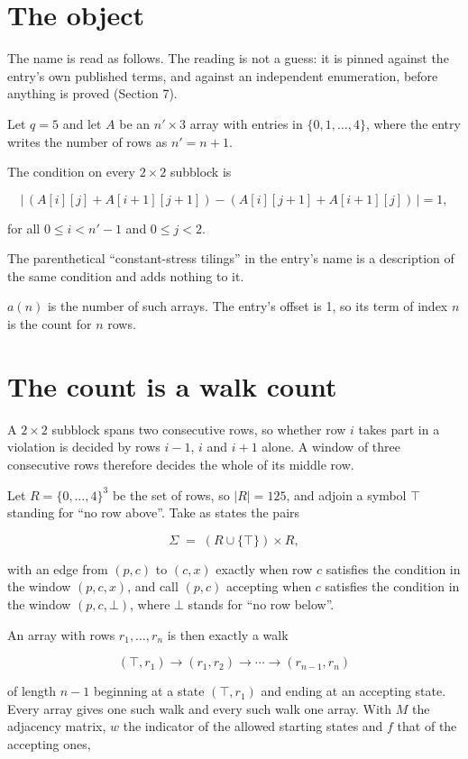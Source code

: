 \documentclass[11pt]{article}
\theoremstyle{definition}
\begin{document}
\section{The object}

The name is read as follows. The reading is not a guess: it is pinned against the entry's own published terms, and against an independent enumeration, before anything is proved (Section 7).

Let $q = 5$ and let $A$ be an $n' \times 3$ array with entries in $\{0,1,\dots,4\}$, where the entry writes the number of rows as $n' = n + 1$.

The condition on every $2 \times 2$ subblock is

\[\bigl|\,(A[i][j] + A[i{+}1][j{+}1]) - (A[i][j{+}1] + A[i{+}1][j])\,\bigr| = 1,\]

for all $0 \le i < n'-1$ and $0 \le j < 2$.

The parenthetical ``constant-stress tilings'' in the entry's name is a description of the same condition and adds nothing to it.

$a(n)$ is the number of such arrays. The entry's offset is 1, so its term of index $n$ is the count for $n$ rows.

\section{The count is a walk count}

A $2 \times 2$ subblock spans two consecutive rows, so whether row $i$ takes part in a violation is decided by rows $i-1$, $i$ and $i+1$ alone. A window of three consecutive rows therefore decides the whole of its middle row.

Let $R = \{0,\dots,4\}^{3}$ be the set of rows, so $|R| = 125$, and adjoin a symbol $\top$ standing for ``no row above''. Take as states the pairs

\[\Sigma \;=\; (R \cup \{\top\}) \times R,\]

with an edge from $(p,c)$ to $(c,x)$ exactly when row $c$ satisfies the condition in the window $(p,c,x)$, and call $(p,c)$ accepting when $c$ satisfies the condition in the window $(p,c,\bot)$, where $\bot$ stands for ``no row below''.

An array with rows $r_1,\dots,r_n$ is then exactly a walk

\[(\top,r_1) \to (r_1,r_2) \to \cdots \to (r_{n-1},r_n)\]

of length $n-1$ beginning at a state $(\top,r_1)$ and ending at an accepting state. Every array gives one such walk and every such walk one array. With $M$ the adjacency matrix, $w$ the indicator of the allowed starting states and $f$ that of the accepting ones,
\end{document}
